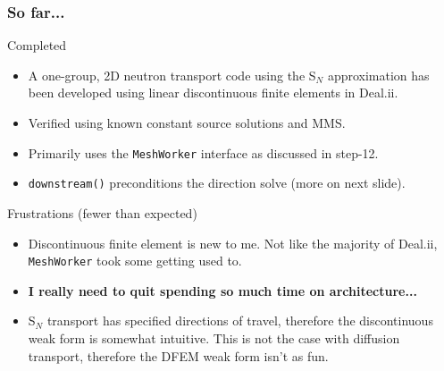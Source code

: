 \documentclass[xcolor={usenames,dvipsnames,svgnames,table}]{beamer}
\begin{document}

\begin{frame}\frametitle{So far...}
	\begin{block}{Completed}
		\begin{itemize}
			\item A one-group, 2D neutron transport code using the S$_N$ approximation has been developed using linear discontinuous finite elements in Deal.ii.
			\item Verified using known constant source solutions and MMS.
			\item Primarily uses the \texttt{MeshWorker} interface as discussed in step-12.
			\item \texttt{downstream()} preconditions the direction solve (more on next slide).
		\end{itemize}
	\end{block}
	\begin{block}{Frustrations \tiny{(fewer than expected)}}
		\begin{itemize}
			\item Discontinuous finite element is new to me. Not like the majority of Deal.ii, \texttt{MeshWorker} took some getting used to.
			\item \textbf{I really need to quit spending so much time on architecture...}
			\item S$_N$ transport has specified directions of travel, therefore the discontinuous weak form is somewhat intuitive. This is not the case with diffusion transport, therefore the DFEM weak form isn't as fun.
		\end{itemize}
	\end{block}
\end{frame}

\end{document}
